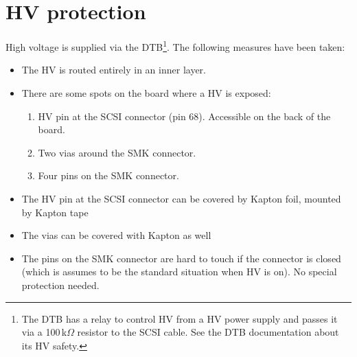 \section{HV protection}
High voltage is supplied via the DTB\footnote{The DTB has a relay to control HV from a HV power supply and passes it via a 100\,k$\Omega$ resistor to the SCSI cable. See the DTB documentation about its HV safety.}. The following measures have been taken:
\begin{itemize}
    \item The HV is routed entirely in an inner layer.
    \item There are some spots on the board where a HV is exposed:
    \begin{enumerate}
	\item HV pin at the SCSI connector (pin 68). Accessible on the back of the board.
	\item Two vias around the SMK connector.
	\item Four pins on the SMK connector.
    \end{enumerate}
    \item The HV pin at the SCSI connector can be covered by Kapton foil, mounted by Kapton tape
    \item The vias can be covered with Kapton as well
    \item The pins on the SMK connector are hard to touch if the connector is closed (which is assumes to be the standard situation when HV is on). No special protection needed.
\end{itemize}

